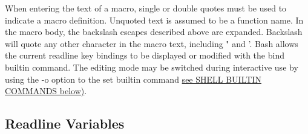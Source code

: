 When entering the text of a macro, single or double quotes must be used to indicate a macro definition. Unquoted text is assumed to be a function name. In the macro body, the backslash escapes described above are expanded. Backslash will quote any other character in the macro text, including " and '.
Bash allows the current readline key bindings to be displayed or modified with the bind builtin command. The editing mode may be switched during interactive use by using the -o option to the set builtin command \hyperref[sec:shellbuiltincommands]{see SHELL BUILTIN COMMANDS below)}.

\subsection{Readline Variables}\label{sec:readlinevariables}

